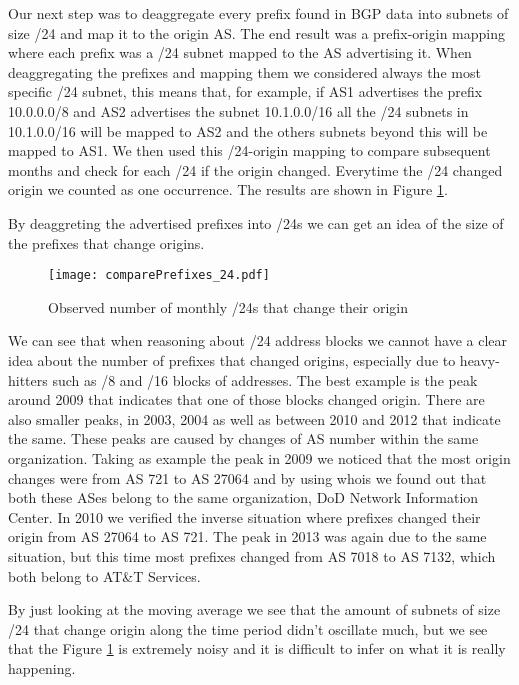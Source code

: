 \documentclass[11pt,a4paper]{scrreprt}
\begin{document}
Our next step was to deaggregate every prefix found in BGP data into subnets of size /24 and map it to the origin AS. The end result was a prefix-origin mapping where each  prefix was a /24 subnet mapped to the AS advertising it. When deaggregating the prefixes and mapping them we considered always the most specific /24 subnet, this means that, for example, if AS1 advertises the prefix 10.0.0.0/8 and AS2 advertises the subnet 10.1.0.0/16 all the /24 subnets in 10.1.0.0/16 will be mapped to AS2 and the others subnets beyond this will be mapped to AS1. We then used this /24-origin mapping to compare subsequent months and check for each /24 if the origin changed. Everytime the /24 changed origin we counted as one occurrence. The results are shown in Figure \ref{fig:comparePrefixes_24}. 

By deaggreting the advertised prefixes into /24s we can get an idea of the size of the prefixes that change origins.  

\begin{figure}[!h]
\centering
\texttt{[image: comparePrefixes\_24.pdf]}
\caption{Observed number of monthly
/24s that change their origin}
\label{fig:comparePrefixes_24}
\end{figure}

We can see that when reasoning about /24 address blocks we cannot have a clear idea about the number of prefixes that changed origins, especially due to heavy-hitters such as /8 and /16 blocks of addresses. The best example is the peak around 2009 that indicates that one of those blocks changed origin. There are also smaller peaks, in 2003, 2004 as well as between 2010 and 2012 that indicate the same.
These peaks are caused by changes of AS number within the same organization. Taking as example the peak in 2009 we noticed that the most origin changes were from AS 721 to AS 27064 and by using whois we found out that both these ASes belong to the same organization, DoD Network Information Center. In 2010 we verified the inverse situation where prefixes changed their origin from AS 27064 to AS 721. The peak in 2013 was again due to the same situation, but this time most prefixes changed from AS 7018 to AS 7132, which both belong to AT&T Services. 
 

By just looking at the moving average we see that the amount of subnets of size /24 that change origin along the time period didn't oscillate much, but we see that the Figure \ref{fig:comparePrefixes_24} is extremely noisy and it is difficult to infer on what it is really happening.
\end{document}
